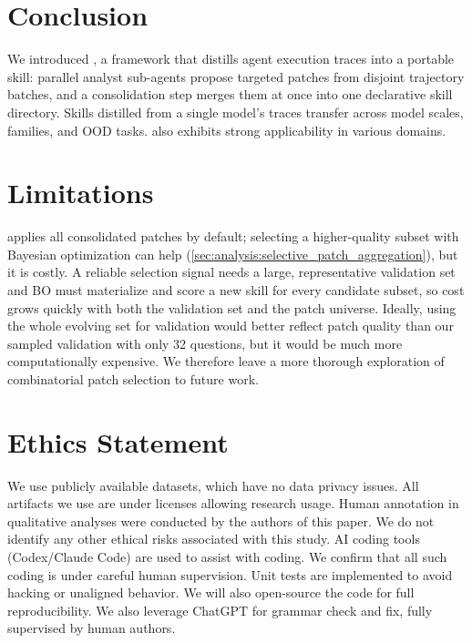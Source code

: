 
\section{Conclusion}
\label{sec:conclusion}

We introduced \systemname, a framework that distills agent execution traces into a portable skill: parallel analyst sub-agents propose targeted patches from disjoint trajectory batches, and a consolidation step merges them at once into one declarative skill directory. Skills distilled from a single model's traces transfer across model scales, families, and OOD tasks. \systemname{} also exhibits strong applicability in various domains.

\section*{Limitations}
\systemname{} applies all consolidated patches by default; selecting a higher-quality subset with Bayesian optimization can help (\cref{sec:analysis:selective_patch_aggregation}), but it is costly. A reliable selection signal needs a large, representative validation set and BO must materialize and score a new skill for every candidate subset, so cost grows quickly with both the validation set and the patch universe. Ideally, using the whole evolving set for validation would better reflect patch quality than our sampled validation with only 32 questions, but it would be much more computationally expensive. We therefore leave a more thorough exploration of combinatorial patch selection to future work.

\section*{Ethics Statement}

We use publicly available datasets, which have no data privacy issues. All artifacts we use are under licenses allowing research usage. Human annotation in qualitative analyses were conducted by the authors of this paper. We do not identify any other ethical risks associated with this study. AI coding tools (Codex/Claude Code) are used to assist with coding. We confirm that all such coding is under careful human supervision. Unit tests are implemented to avoid hacking or unaligned behavior. We will also open-source the code for full reproducibility. We also leverage ChatGPT for grammar check and fix, fully supervised by human authors.

